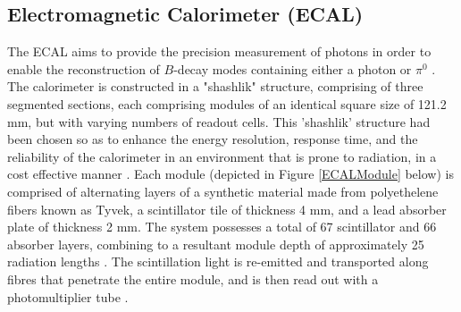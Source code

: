 \subsection{Electromagnetic Calorimeter (ECAL)}
The ECAL aims to provide the precision measurement of photons in order to enable the reconstruction of $B$-decay modes containing either a photon or $\pi^{0}$ \cite{GOLUTVIN2003258}.
The calorimeter is constructed in a "shashlik" structure, comprising of three segmented sections, each comprising modules of an identical square size of 121.2 mm, but with varying numbers of
readout cells. This 'shashlik' structure had been chosen so as to enhance the energy resolution, response time, and the reliability of the calorimeter in an environment that is prone to radiation, in a cost effective manner \cite{Amato:494264}. Each module (depicted in Figure \ref{ECALModule} below) is comprised of alternating layers of a synthetic material made from polyethelene fibers known as Tyvek, a scintillator tile of thickness 4 mm, and a lead absorber plate of thickness 2 mm.
The system possesses a total of 67 scintillator and 66 absorber layers, combining to a resultant module depth of approximately 25 radiation lengths \cite{AbellanBeteta:2020amj}. The scintillation light is re-emitted and transported along fibres that penetrate the entire
module, and is then read out with a photomultiplier tube \cite{AbellanBeteta:2020amj}.

